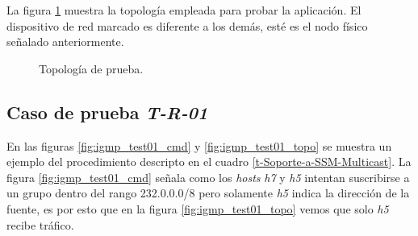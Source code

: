 La figura \ref{fig:topo_grande} muestra la topología empleada para probar la aplicación. El dispositivo de red marcado es diferente a los demás, esté es el nodo físico señalado anteriormente.

\begin{figure}[th]
	\centering 
	\caption[Topología de prueba]{Topología de prueba.}
	\label{fig:topo_grande}
\end{figure}

\subsection*{Caso de prueba \textit{T-R-01}}

En las figuras \ref{fig:igmp_test01_cmd} y \ref{fig:igmp_test01_topo} se muestra un ejemplo del procedimiento descripto en el cuadro \ref{t-Soporte-a-SSM-Multicast}. La figura \ref{fig:igmp_test01_cmd} señala como los \textit{hosts} \textit{h7} y \textit{h5} intentan suscribirse a un grupo dentro del rango 232.0.0.0/8 pero solamente \textit{h5} indica la dirección de la fuente, es por esto que en la figura \ref{fig:igmp_test01_topo} vemos que solo \textit{h5} recibe tráfico.

